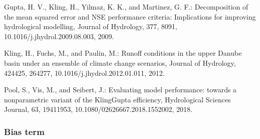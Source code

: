 \documentclass[letterpaper,10pt,english]{sphinxmanual}
\begin{document}
\begin{fulllineitems}
Gupta, H. V., Kling, H., Yilmaz, K. K., and Martinez, G. F.: Decomposition
of the mean squared error and NSE performance criteria: Implications for
improving hydrological modelling, Journal of Hydrology, 377, 80\sphinxhyphen{}91,
10.1016/j.jhydrol.2009.08.003, 2009.

Kling, H., Fuchs, M., and Paulin, M.: Runoff conditions in the upper
Danube basin under an ensemble of climate change scenarios, Journal of
Hydrology, 424\sphinxhyphen{}425, 264\sphinxhyphen{}277, 10.1016/j.jhydrol.2012.01.011, 2012.

Pool, S., Vis, M., and Seibert, J.: Evaluating model performance: towards a
non\sphinxhyphen{}parametric variant of the Kling\sphinxhyphen{}Gupta efficiency, Hydrological Sciences
Journal, 63, 1941\sphinxhyphen{}1953, 10.1080/02626667.2018.1552002, 2018.

\end{fulllineitems}



\subsubsection{Bias term}
\label{\detokenize{reference/kge:bias-term}}
\end{document}
